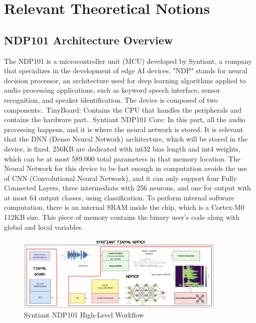 \chapter{Relevant Theoretical Notions}
\label{cha:background}

\section{NDP101 Architecture Overview}
\label{sec:architecture}
The NDP101 is a microcontroller unit (MCU) developed by Syntiant\cite{description_ndp101}, a company that specializes in the development of edge AI devices. "NDP" stands for neural decision processor, an architecture used for deep learning algorithms applied to audio processing applications, such as keyword speech interface, sensor recognition, and speaker identification. The device is composed of two components:. TinyBoard: Contains the CPU that handles the peripherals and contains the hardware part.. Syntiant NDP101 Core: In this part, all the audio processing happens, and it is where the neural network is stored. It is relevant that the DNN (Dense Neural Network)\cite{neural_network_theory} architecture, which will be stored in the device, is fixed. 256KB are dedicated with int32 bias length and int4 weights\cite{wu2023understandingint4quantizationtransformer}, which can be at most 589.000 total parameters in that memory location. The Neural Network for this device to be fast enough in computation avoids the use of CNN (Convolutional Neural Network)\cite{introduction_CNN}, and it can only support four Fully Connected Layers, three intermediate with 256 neurons, and one for output with at most 64 output classes, using classification. To perform internal software computation, there is an internal SRAM inside the chip, which is a Cortex-M0 112KB size. This piece of memory contains the binary user's code along with global and local variables\cite{experimental_try_on_ndp101}\cite{description_ndp101}\cite{hardware_ndp101}.
\begin{figure}[!h]
    \centering
        \includegraphics[width=0.9\textwidth]{images/2.01 NDP101 High Level Workflow.png}
        \caption{Syntiant NDP101 High-Level Workflow}
        \label{fig:syntiant workflow}
\end{figure}
